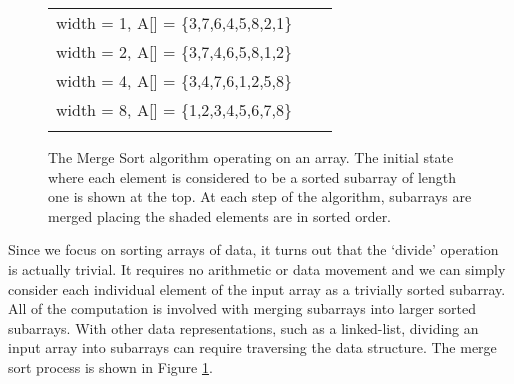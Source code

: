 \begin{figure}
\centering
\setlength{\fboxsep}{1pt}
\begin{tabular} {l l l } 
width = 1, A[] = \{\colorbox{black!10}{3},\colorbox{black!10}{7},\colorbox{black!10}{6},\colorbox{black!10}{4},\colorbox{black!10}{5},\colorbox{black!10}{8},\colorbox{black!10}{2},\colorbox{black!10}{1}\} \\
width = 2, A[] = \{\colorbox{black!10}{3,\hspace*{2\fboxsep}7},\colorbox{black!10}{4,\hspace*{2\fboxsep}6},\colorbox{black!10}{5,\hspace*{2\fboxsep}8},\colorbox{black!10}{1,\hspace*{2\fboxsep}2}\} \\
width = 4, A[] = \{\colorbox{black!10}{3,\hspace*{2\fboxsep}4,\hspace*{2\fboxsep}7,\hspace*{2\fboxsep}6},\colorbox{black!10}{1,\hspace*{2\fboxsep}2,\hspace*{2\fboxsep}5,\hspace*{2\fboxsep}8}\} \\
width = 8, A[] = \{\colorbox{black!10}{1,\hspace*{2\fboxsep}2,\hspace*{2\fboxsep}3,\hspace*{2\fboxsep}4,\hspace*{2\fboxsep}5,\hspace*{2\fboxsep}6,\hspace*{2\fboxsep}7,\hspace*{2\fboxsep}8}\} \\
\\
\end{tabular}
\caption{The Merge Sort algorithm operating on an array.  The initial state where each element is considered to be a sorted subarray of length one is shown at the top.   At each step of the algorithm, subarrays are merged placing the shaded elements are in sorted order.}
\label{fig:merge_sort_behavior}
\end{figure}

Since we focus on sorting arrays of data, it turns out that the `divide' operation is actually trivial.  It requires no arithmetic or data movement and we can simply consider each individual element of the input array as a trivially sorted subarray.  All of the computation is involved with merging subarrays into larger sorted subarrays.  With other data representations, such as a linked-list, dividing an input array into subarrays can require traversing the data structure.   The merge sort process is shown in Figure \ref{fig:merge_sort_behavior}.  


